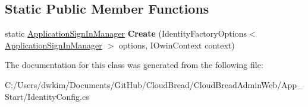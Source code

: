 \subsection*{Static Public Member Functions}
\begin{DoxyCompactItemize}
\item 
static \hyperlink{class_cloud_bread_admin_web_1_1_application_sign_in_manager}{Application\+Sign\+In\+Manager} {\bfseries Create} (Identity\+Factory\+Options$<$ \hyperlink{class_cloud_bread_admin_web_1_1_application_sign_in_manager}{Application\+Sign\+In\+Manager} $>$ options, I\+Owin\+Context context)\hypertarget{class_cloud_bread_admin_web_1_1_application_sign_in_manager_abf1f7666bdcdbc0fe090e1f5e873c88e}{}\label{class_cloud_bread_admin_web_1_1_application_sign_in_manager_abf1f7666bdcdbc0fe090e1f5e873c88e}

\end{DoxyCompactItemize}


The documentation for this class was generated from the following file\+:\begin{DoxyCompactItemize}
\item 
C\+:/\+Users/dwkim/\+Documents/\+Git\+Hub/\+Cloud\+Bread/\+Cloud\+Bread\+Admin\+Web/\+App\+\_\+\+Start/Identity\+Config.\+cs\end{DoxyCompactItemize}
